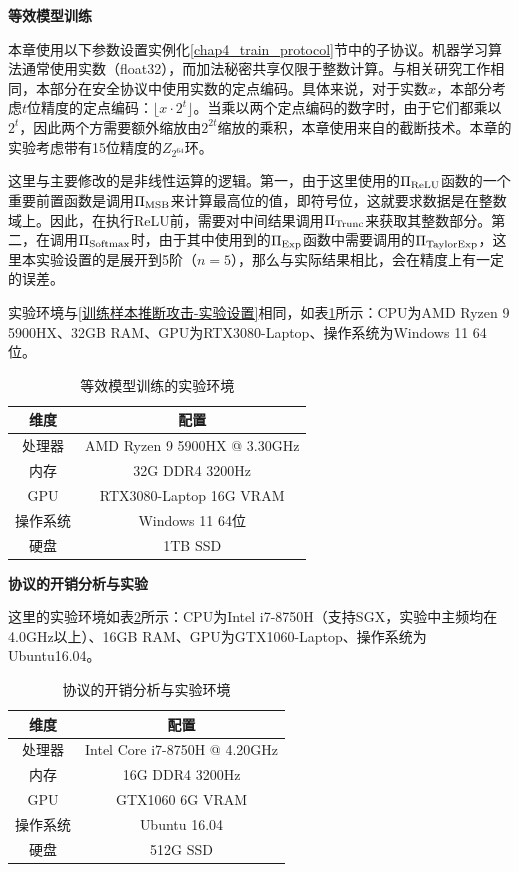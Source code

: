 \textbf{等效模型训练}

本章使用以下参数设置实例化\ref{chap4_train_protocol}节中的子协议。机器学习算法通常使用实数（float32），而加法秘密共享仅限于整数计算。与相关研究工作相同\cite{secureml, aby3, cryptgpu, secgnn}，本部分在安全协议中使用实数的定点编码。具体来说，对于实数$x$，本部分考虑$t$位精度的定点编码：$\lfloor x\cdot 2^t\rfloor$。当乘以两个定点编码的数字时，由于它们都乘以$2^t$，因此两个方需要额外缩放由$2^{2t}$缩放的乘积，本章使用来自\cite{secureml}的截断技术。本章的实验考虑带有15位精度的$Z_{2^{64}}$环。%

这里与主要修改的是非线性运算的逻辑。第一，由于这里使用的$\Pi_{\rm ReLU}$函数的一个重要前置函数是调用$\Pi_{\rm MSB}$来计算最高位的值，即符号位，这就要求数据是在整数域上。因此，在执行ReLU前，需要对中间结果调用$\Pi_{\rm Trunc}$来获取其整数部分。第二，在调用$\Pi_{\rm Softmax}$时，由于其中使用到的$\Pi_{\rm Exp}$函数中需要调用的$\Pi_{\rm TaylorExp}$，这里本实验设置的是展开到5阶（$n=5$），那么与实际结果相比，会在精度上有一定的误差。

实验环境与\ref{训练样本推断攻击-实验设置}相同，如表\ref{chap4_exp1_env}所示：CPU为AMD Ryzen 9 5900HX、32GB RAM、GPU为RTX3080-Laptop、操作系统为Windows 11 64位。

\begin{table}[]
	\centering
	\caption{等效模型训练的实验环境}
	\begin{tabular}{|c|c|}
		\hline
		维度&配置
		\\ \hline
		
		处理器&AMD Ryzen 9 5900HX @ 3.30GHz    \\ \hline
		内存&32G DDR4 3200Hz    \\ \hline
		GPU&RTX3080-Laptop 16G VRAM    \\ \hline
		操作系统&Windows 11 64位    \\ \hline
		硬盘&1TB SSD    \\ \hline
	\end{tabular}
	\label{chap4_exp1_env}
\end{table}

\textbf{协议的开销分析与实验}

这里的实验环境如表\ref{chap4_exp2_env}所示：CPU为Intel i7-8750H（支持SGX，实验中主频均在4.0GHz以上）、16GB RAM、GPU为GTX1060-Laptop、操作系统为Ubuntu16.04。

\begin{table}[]
	\centering
	\caption{协议的开销分析与实验环境}
	\begin{tabular}{|c|c|}
		\hline
		维度&配置
		\\ \hline
		
		处理器&Intel Core i7-8750H @ 4.20GHz    \\ \hline
		内存&16G DDR4 3200Hz    \\ \hline
		GPU&GTX1060 6G VRAM    \\ \hline
		操作系统&Ubuntu 16.04    \\ \hline
		硬盘&512G SSD    \\ \hline
	\end{tabular}
	\label{chap4_exp2_env}
\end{table}


